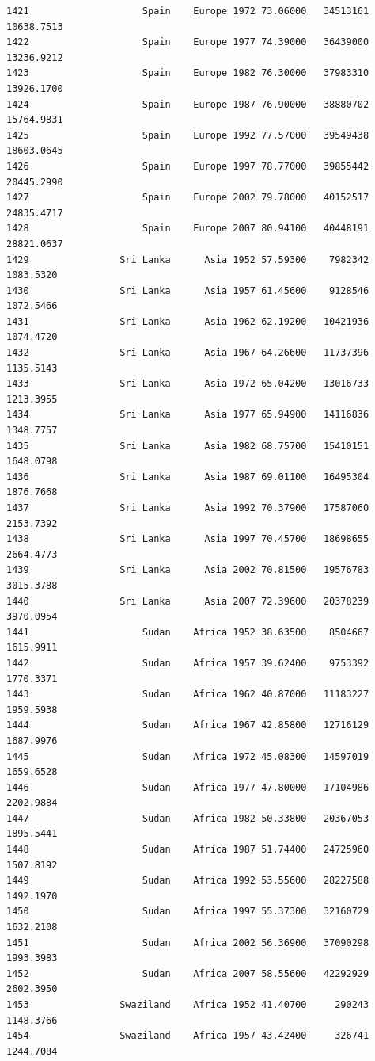 \documentclass[
  letterpaper,
  DIV=11,
  numbers=noendperiod]{scrreprt}
\begin{document}
\begin{verbatim}
1421                    Spain    Europe 1972 73.06000   34513161  10638.7513
1422                    Spain    Europe 1977 74.39000   36439000  13236.9212
1423                    Spain    Europe 1982 76.30000   37983310  13926.1700
1424                    Spain    Europe 1987 76.90000   38880702  15764.9831
1425                    Spain    Europe 1992 77.57000   39549438  18603.0645
1426                    Spain    Europe 1997 78.77000   39855442  20445.2990
1427                    Spain    Europe 2002 79.78000   40152517  24835.4717
1428                    Spain    Europe 2007 80.94100   40448191  28821.0637
1429                Sri Lanka      Asia 1952 57.59300    7982342   1083.5320
1430                Sri Lanka      Asia 1957 61.45600    9128546   1072.5466
1431                Sri Lanka      Asia 1962 62.19200   10421936   1074.4720
1432                Sri Lanka      Asia 1967 64.26600   11737396   1135.5143
1433                Sri Lanka      Asia 1972 65.04200   13016733   1213.3955
1434                Sri Lanka      Asia 1977 65.94900   14116836   1348.7757
1435                Sri Lanka      Asia 1982 68.75700   15410151   1648.0798
1436                Sri Lanka      Asia 1987 69.01100   16495304   1876.7668
1437                Sri Lanka      Asia 1992 70.37900   17587060   2153.7392
1438                Sri Lanka      Asia 1997 70.45700   18698655   2664.4773
1439                Sri Lanka      Asia 2002 70.81500   19576783   3015.3788
1440                Sri Lanka      Asia 2007 72.39600   20378239   3970.0954
1441                    Sudan    Africa 1952 38.63500    8504667   1615.9911
1442                    Sudan    Africa 1957 39.62400    9753392   1770.3371
1443                    Sudan    Africa 1962 40.87000   11183227   1959.5938
1444                    Sudan    Africa 1967 42.85800   12716129   1687.9976
1445                    Sudan    Africa 1972 45.08300   14597019   1659.6528
1446                    Sudan    Africa 1977 47.80000   17104986   2202.9884
1447                    Sudan    Africa 1982 50.33800   20367053   1895.5441
1448                    Sudan    Africa 1987 51.74400   24725960   1507.8192
1449                    Sudan    Africa 1992 53.55600   28227588   1492.1970
1450                    Sudan    Africa 1997 55.37300   32160729   1632.2108
1451                    Sudan    Africa 2002 56.36900   37090298   1993.3983
1452                    Sudan    Africa 2007 58.55600   42292929   2602.3950
1453                Swaziland    Africa 1952 41.40700     290243   1148.3766
1454                Swaziland    Africa 1957 43.42400     326741   1244.7084

\end{verbatim}
\end{document}
